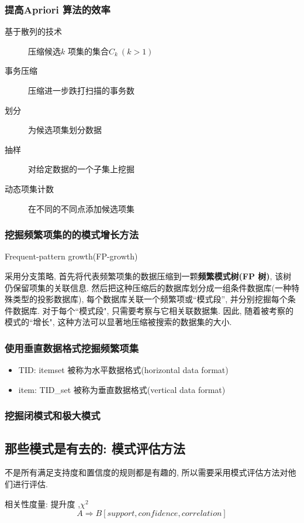 \documentclass{article}
\begin{document}
\subsubsection{提高Apriori 算法的效率}
\begin{description}
	\item[基于散列的技术] 压缩候选$k$ 项集的集合$C_k\ (k > 1)$
	\item[事务压缩] 压缩进一步跌打扫描的事务数
	\item[划分] 为候选项集划分数据
	\item[抽样] 对给定数据的一个子集上挖掘
	\item[动态项集计数] 在不同的不同点添加候选项集
\end{description}

\subsubsection{挖掘频繁项集的的模式增长方法}
Frequent-pattern growth(FP-growth)

采用分支策略, 首先将代表频繁项集的数据压缩到一颗\textbf{频繁模式树(FP 树)}, 该树仍保留项集的关联信息. 然后把这种压缩后的数据库划分成一组条件数据库(一种特殊类型的投影数据库), 每个数据库关联一个频繁项或``模式段'', 并分别挖掘每个条件数据库. 对于每个``模式段", 只需要考察与它相关联数据集. 因此, 随着被考察的模式的``增长", 这种方法可以显著地压缩被搜索的数据集的大小.

\subsubsection{使用垂直数据格式挖掘频繁项集}
\begin{itemize}
	\item TID: itemset 被称为水平数据格式(horizontal data format)
	\item item: TID\_set 被称为垂直数据格式(vertical data format)
\end{itemize}

\subsubsection{挖掘闭模式和极大模式}

\subsection{那些模式是有去的: 模式评估方法}
不是所有满足支持度和置信度的规则都是有趣的, 所以需要采用模式评估方法对他们进行评估.

相关性度量: 提升度 ,$\chi^2$\\
$$
A \Rightarrow B[support, confidence, correlation]
$$
\end{document}
